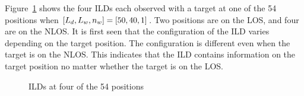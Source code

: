 Figure~\ref{fig:ILDs} shows the four ILDs each observed with a target at one of the 54 positions when $\left [ L_d, L_w, n_w \right ] = \left [ 50, 40, 1 \right ]$.  Two positions are on the LOS, and four are on the NLOS.  It is first seen that the configuration of the ILD varies depending on the target position.  The configuration is different even when the target is on the NLOS.  This indicates that the ILD contains information on the target position no matter whether the target is on the LOS.  

\begin{figure}[ht]
	\centering
	\caption{ILDs at four of the 54 positions}
	\label{fig:ILDs}
\end{figure}

